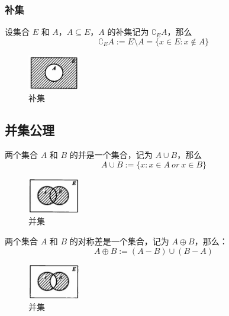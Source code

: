 \newpage
\subsubsection{补集}
\begin{definition}[补集]
    设集合 $ E $ 和 $ A $，$ A\subseteq E $，$ A $ 的补集记为 $ \complement_EA $，那么
    \[
        \complement_EA := E \setminus A = \{x\in E:x\notin A\}
    \]
\end{definition}

\begin{figure}[htbp]
    \centering
    \includegraphics[width=0.2\textwidth]{figures/chapter1/chapter1_3} 
    \caption{补集}
    \label{fig:chapter1_3}
\end{figure}

\subsection{并集公理}
\begin{definition}[并集 Union]
    两个集合 $ A $ 和 $ B $ 的并是一个集合，记为 $ A \cup B $，那么
    \[
        A\cup B := \{x:x\in A\ or\ x\in B\} 
    \]
\end{definition}

\begin{figure}[htbp]
    \centering
    \includegraphics[width=0.2\textwidth]{figures/chapter1/chapter1_4} 
    \caption{并集}
    \label{fig:chapter1_4}
\end{figure}

\begin{definition}
    两个集合 $ A $ 和 $ B $ 的对称差是一个集合，记为 $ A \oplus  B $，那么：
    \[
        A\oplus  B := (A-B) \cup (B-A) 
    \]
\end{definition}

\begin{figure}[htbp]
    \centering
    \includegraphics[width=0.2\textwidth]{figures/chapter1/chapter1_5} 
    \caption{并集}
    \label{fig:chapter1_5}
\end{figure}

